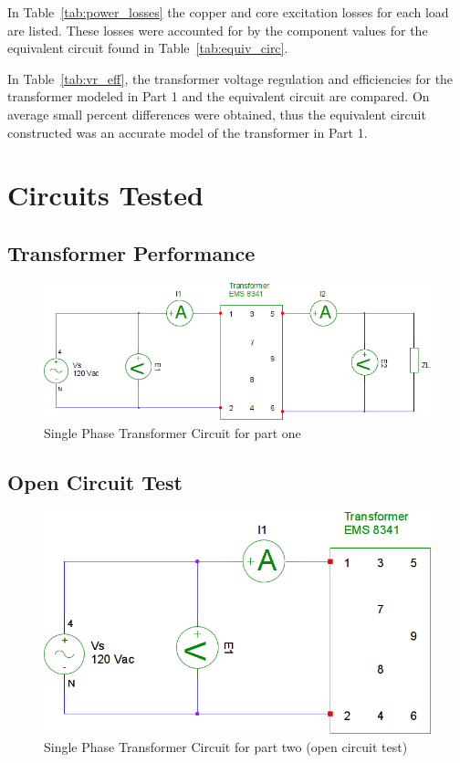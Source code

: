 \documentclass{article}
\begin{document}
In Table~\ref{tab:power_losses} the copper and core excitation losses for each load are listed. These losses were
accounted for by the component values for the equivalent circuit found in Table~\ref{tab:equiv_circ}.

In Table~\ref{tab:vr_eff}, the transformer voltage regulation and efficiencies for the transformer modeled in Part 1
and the equivalent circuit are compared. On average small percent differences were obtained, thus the equivalent 
circuit constructed was an accurate model of the transformer in Part 1.


\pagebreak
\section*{Circuits Tested}
\subsection*{Transformer Performance}
\begin{figure}[H]
  \centering
  \includegraphics[width=.8\textwidth]{img/circuit_01}
  \caption{Single Phase Transformer Circuit for part one}
  \label{fig:circuit_01}
\end{figure}

\subsection*{Open Circuit Test}
\begin{figure}[H]
  \centering
  \includegraphics[width=.8\textwidth]{img/circuit_02}
  \caption{Single Phase Transformer Circuit for part two (open circuit test)}
  \label{fig:circuit_02}
\end{figure}
\end{document}
